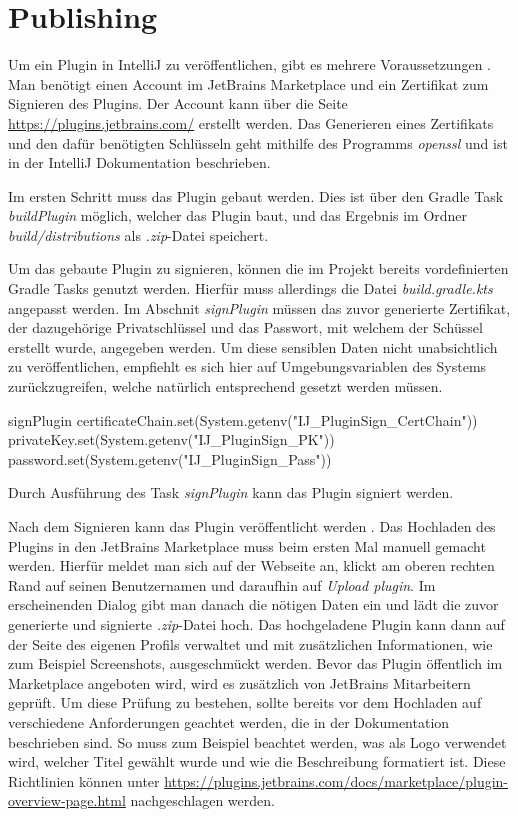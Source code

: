\section{Publishing}
\label{sec:EntwicklungIntelliJ_Publishing}

Um ein Plugin in IntelliJ zu veröffentlichen, gibt es mehrere Voraussetzungen
\cite{IntelliJPlatformSDKPluginSigning}.
Man benötigt einen Account im JetBrains Marketplace und ein Zertifikat
zum Signieren des Plugins. Der Account kann über die Seite 
\url{https://plugins.jetbrains.com/} erstellt werden. Das Generieren eines
Zertifikats und den dafür benötigten Schlüsseln geht mithilfe des 
Programms \emph{openssl} und ist in der IntelliJ Dokumentation beschrieben.

Im ersten Schritt muss das Plugin gebaut werden. Dies ist über den
Gradle Task \emph{buildPlugin} möglich, welcher das Plugin baut, und
das Ergebnis im Ordner \emph{build/distributions} als \emph{.zip}-Datei
speichert.

Um das gebaute Plugin zu signieren, können die im Projekt bereits vordefinierten
Gradle Tasks genutzt werden. Hierfür muss allerdings die Datei 
\emph{build.gradle.kts} angepasst werden. Im Abschnit \emph{signPlugin}
müssen das zuvor generierte Zertifikat, der dazugehörige Privatschlüssel
und das Passwort, mit welchem der Schüssel erstellt wurde, angegeben werden.
Um diese sensiblen Daten nicht unabsichtlich zu veröffentlichen, empfiehlt
es sich hier auf Umgebungsvariablen des Systems zurückzugreifen, welche
natürlich entsprechend gesetzt werden müssen.
\begin{JsCode}[numbers=none]
    signPlugin {
        certificateChain.set(System.getenv("IJ_PluginSign_CertChain"))
        privateKey.set(System.getenv("IJ_PluginSign_PK"))
        password.set(System.getenv("IJ_PluginSign_Pass"))
    }
\end{JsCode}
Durch Ausführung des Task \emph{signPlugin} kann das Plugin signiert werden.

Nach dem Signieren kann das Plugin veröffentlicht werden
\cite{IntelliJPlatformSDKPublishingAPlugin}.
Das Hochladen des Plugins in den JetBrains Marketplace muss beim ersten Mal
manuell gemacht werden. Hierfür meldet man sich auf der Webseite an,
klickt am oberen rechten Rand auf seinen Benutzernamen und daraufhin
auf \emph{Upload plugin}. Im erscheinenden Dialog gibt man
danach die nötigen Daten ein und lädt die zuvor generierte und signierte
\emph{.zip}-Datei hoch.
Das hochgeladene Plugin kann dann auf der Seite des eigenen Profils
verwaltet und mit zusätzlichen Informationen, wie zum Beispiel Screenshots,
ausgeschmückt werden.
Bevor das Plugin öffentlich im Marketplace angeboten wird, wird es 
zusätzlich von JetBrains Mitarbeitern geprüft. Um diese Prüfung
zu bestehen, sollte bereits vor dem Hochladen auf verschiedene
Anforderungen geachtet werden, die in der Dokumentation beschrieben sind.
So muss zum Beispiel beachtet werden, was als Logo verwendet wird, welcher
Titel gewählt wurde und wie die Beschreibung formatiert ist.
Diese Richtlinien können unter \url{https://plugins.jetbrains.com/docs/marketplace/plugin-overview-page.html}
nachgeschlagen werden.

